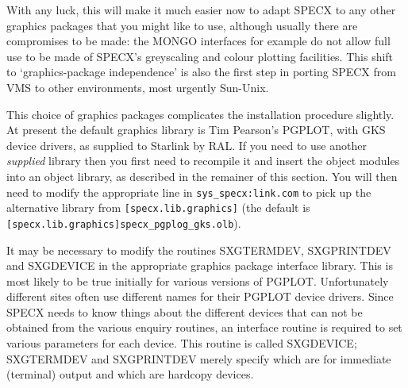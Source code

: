 \documentclass[11pt,twoside]{report}
\begin{document}
With any luck, this will make it much easier now to adapt SPECX to any
other graphics packages that you might like to use, although usually
there are compromises to be made: the MONGO interfaces for example do
not allow full use to be made of SPECX's greyscaling and colour
plotting facilities. This shift to `graphics-package independence' is
also the first step in porting SPECX from VMS to other environments,
most urgently Sun-Unix.

This choice of graphics packages complicates the installation procedure
slightly. At present the default graphics library is Tim Pearson's PGPLOT, with
GKS device drivers, as supplied to Starlink by RAL. If you need to use another
{\em supplied} library then you first need to recompile it and insert the
object modules into an object library, as described in the remainer of this
section. You will then need to modify the appropriate line in
\verb+sys_specx:link.com+ to pick up the alternative library from
\verb+[specx.lib.graphics]+ (the default is\\
\verb+[specx.lib.graphics]specx_pgplog_gks.olb+).

It may be necessary to modify the
routines SXGTERMDEV, SXGPRINTDEV and SXGDEVICE in the appropriate graphics
package interface library. This is most likely to be true initially for various
versions of PGPLOT. Unfortunately different sites often use different names for
their PGPLOT device drivers. Since SPECX needs to know things about the
different devices that can not be obtained from the various enquiry routines,
an interface routine is required to set various parameters for each device.
This routine is called SXGDEVICE; SXGTERMDEV and SXGPRINTDEV merely specify
which are for immediate (terminal) output and which are hardcopy devices. 
\end{document}
